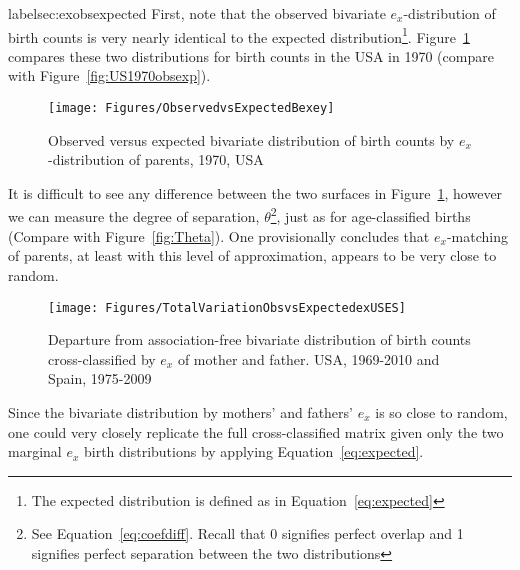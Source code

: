 label{sec:exobsexpected}
First, note that the observed bivariate $e_x$-distribution of birth counts is
very nearly identical to the expected distribution\footnote{The expected
distribution is defined as in Equation~\eqref{eq:expected}}.
Figure~\ref{fig:US1970obsexpex} compares these two distributions for birth counts in the USA in 1970 (compare with Figure~\ref{fig:US1970obsexp}). 

\begin{figure}[ht!]
        \centering  
          \caption{Observed versus expected bivariate distribution of birth
          counts by $e_x$-distribution of parents, 1970, USA}
           \texttt{[image: Figures/ObservedvsExpectedBexey]}
          \label{fig:US1970obsexpex}
\end{figure}

It is
difficult to see any difference between the two surfaces in
Figure~\ref{fig:US1970obsexpex}, however we can measure the degree of
separation, $\theta$\footnote{See Equation~\eqref{eq:coefdiff}. Recall that 0 signifies
perfect overlap and 1 signifies perfect separation between the two
distributions}, just as for age-classified births (Compare with
Figure~\ref{fig:Theta}). One provisionally concludes that $e_x$-matching of
parents, at least with this level of approximation, appears to be very close to random.

\begin{figure}[ht!]
        \centering  
          \caption{Departure from association-free bivariate distribution of
          birth counts cross-classified by $e_x$ of mother and father. USA,
          1969-2010 and Spain, 1975-2009}
           \texttt{[image: Figures/TotalVariationObsvsExpectedexUSES]}
          \label{fig:TotalVarobsexpex}
\end{figure}

Since the bivariate distribution by mothers' and fathers' $e_x$ is so close
to random, one could very closely replicate the full cross-classified matrix 
given only the two marginal
$e_x$ birth distributions by applying Equation~\eqref{eq:expected}. 


